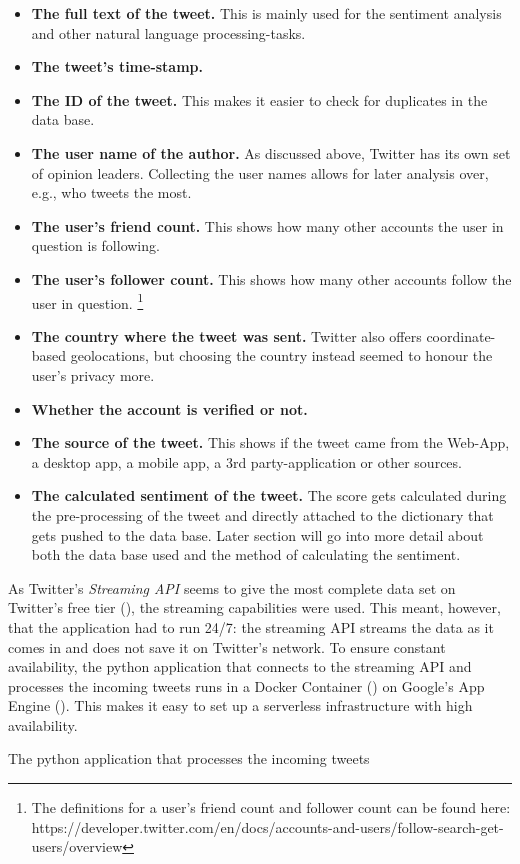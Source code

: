 \begin{itemize}
\item \textbf{The full text of the tweet.} This is mainly used for the sentiment analysis and other natural language processing-tasks.
\item \textbf{The tweet's time-stamp.}
\item \textbf{The ID of the tweet.} This makes it easier to check for duplicates in the data base. 
\item \textbf{The user name of the author.} As discussed above, Twitter has its own set of opinion leaders. Collecting the user names allows for later analysis over, e.g., who tweets the most.
\item \textbf{The user's friend count.} This shows how many other accounts the user in question is following.
\item \textbf{The user's follower count.} This shows how many other accounts follow the user in question. \footnote{The definitions for a user's friend count and follower count can be found here: https://developer.twitter.com/en/docs/accounts-and-users/follow-search-get-users/overview}
\item \textbf{The country where the tweet was sent.} Twitter also offers coordinate-based geolocations, but choosing the country instead seemed to honour the user's privacy more.
\item \textbf{Whether the account is verified or not.}
\item \textbf{The source of the tweet.} This shows if the tweet came from the Web-App, a desktop app, a mobile app, a 3rd party-application or other sources.
\item \textbf{The calculated sentiment of the tweet.} The score gets calculated during the pre-processing of the tweet and directly attached to the dictionary that gets pushed to the data base. Later section will go into more detail about both the data base used and the method of calculating the sentiment.
\end{itemize}





As Twitter's \emph{Streaming API} seems to give the most complete data set on Twitter's free tier (\cite{bruns_twitter_2014}), the streaming capabilities were used. This meant, however, that the application had to run 24/7: the streaming API streams the data as it comes in and does not save it on Twitter's network. To ensure constant availability, the python application that connects to the streaming API and processes the incoming tweets runs in a Docker Container (\cite{merkel2014docker}) on Google's App Engine (\cite{google_app_2020}). This makes it easy to set up a serverless infrastructure with high availability.

The python application that processes the incoming tweets 